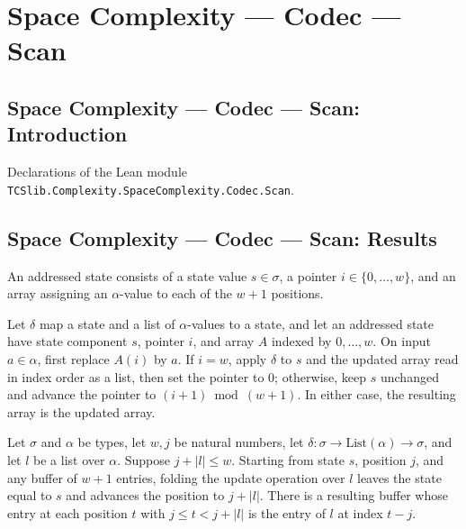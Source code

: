 \section{Space Complexity --- Codec --- Scan}
\subsection*{Space Complexity --- Codec --- Scan: Introduction}

Declarations of the Lean module \texttt{TCSlib.Complexity.SpaceComplexity.Codec.Scan}.

\subsection*{Space Complexity --- Codec --- Scan: Results}

\begin{definition}
\label{Complexity.Codec.AdSt}
\leanok
An addressed state consists of a state value $s\in\sigma$, a pointer
$i\in\{0,\ldots,w\}$, and an array assigning an $\alpha$-value to each of the $w+1$
positions.
\end{definition}

\begin{definition}
\label{Complexity.Codec.adStep}
\leanok
{}
Let $\delta$ map a state and a list of $\alpha$-values to a state, and let an addressed
state have state component $s$, pointer $i$, and array $A$ indexed by $0,\ldots,w$. On
input $a\in\alpha$, first replace $A(i)$ by $a$. If $i=w$, apply $\delta$ to $s$ and the
updated array read in index order as a list, then set the pointer to $0$; otherwise,
keep $s$ unchanged and advance the pointer to $(i+1)\bmod(w+1)$. In either case, the
resulting array is the updated array.
\end{definition}

\begin{lemma}
\label{Complexity.Codec.foldl_adStep_partial}
\leanok
{}
Let $\sigma$ and $\alpha$ be types, let $w,j$ be natural numbers, let $\delta : \sigma
\to \mathrm{List}(\alpha) \to \sigma$, and let $l$ be a list over $\alpha$. Suppose
$j+|l|\le w$. Starting from state $s$, position $j$, and any buffer of $w+1$ entries,
folding the update operation over $l$ leaves the state equal to $s$ and advances the
position to $j+|l|$. There is a resulting buffer whose entry at each position $t$ with
$j\le t<j+|l|$ is the entry of $l$ at index $t-j$.
\end{lemma}


